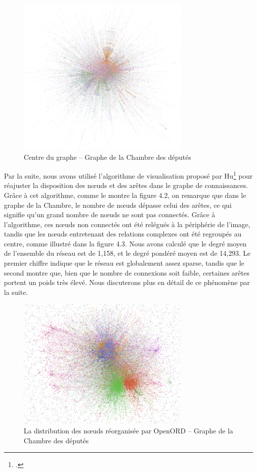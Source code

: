 \documentclass[a4paper,twoside,12pt]{book}
\begin{document}
\begin{figure}
\centering %
\includegraphics[width=0.75\textwidth]{img/chambre_close_view.png}
\caption{Centre du graphe – Graphe de la Chambre des députés}
\end{figure}

Par la suite, nous avons utilisé l'algorithme de visualisation proposé par Hu\footcite{hu2006} pour réajuster la disposition des nœuds et des arêtes dans le graphe de connaissances. Grâce à cet algorithme, comme le montre la figure 4.2, on remarque que dans le graphe de la Chambre, le nombre de nœuds dépasse celui des arêtes, ce qui signifie qu'un grand nombre de nœuds ne sont pas connectés. Grâce à l'algorithme, ces nœuds non connectés ont été relégués à la périphérie de l'image, tandis que les nœuds entretenant des relations complexes ont été regroupés au centre, comme illustré dans la figure 4.3. Nous avons calculé que le degré moyen de l'ensemble du réseau est de 1,158, et le degré pondéré moyen est de 14,293. Le premier chiffre indique que le réseau est globalement assez sparse, tandis que le second montre que, bien que le nombre de connexions soit faible, certaines arêtes portent un poids très élevé. Nous discuterons plus en détail de ce phénomène par la suite.

\begin{figure}
\centering %
\includegraphics[width=0.75\textwidth]{img/chambre_openord.png}
\caption{La distribution des nœuds réorganisée par OpenORD – Graphe de la Chambre des députés}
\end{figure}
\end{document}
